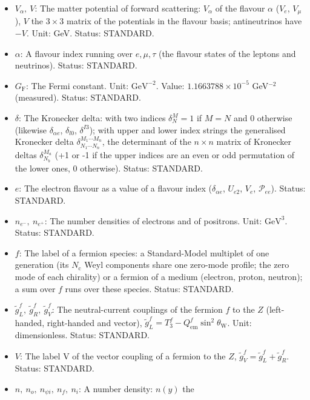 \documentclass[
  10pt,
]{article}
\providecommand{\tightlist}{%
  \setlength{\itemsep}{0pt}\setlength{\parskip}{0pt}}
\begin{document}
\begin{itemize}
\tightlist
\item
  \(V_\alpha,\ V\): The matter potential of forward scattering:
  \(V_\alpha\) of the flavour \(\alpha\) (\(V_e\), \(V_\mu\)), \(V\) the
  \(3 \times 3\) matrix of the potentials in the flavour basis;
  antineutrinos have \(-V\). Unit: GeV. Status: STANDARD.
\item
  \(\alpha\): A flavour index running over \(e, \mu, \tau\) (the flavour
  states of the leptons and neutrinos). Status: STANDARD.
\item
  \(G_{\mathrm{F}}\): The Fermi constant. Unit: \(\mathrm{GeV}^{-2}\).
  Value: \(1.1663788\times10^{-5}\) GeV\(^{-2}\) (measured). Status:
  STANDARD.
\item
  \(\delta\): The Kronecker delta: with two indices \(\delta^M_N = 1\)
  if \(M = N\) and 0 otherwise (likewise \(\delta_{\alpha e}\),
  \(\delta_{l0}\), \(\delta^{I3}\)); with upper and lower index strings
  the generalised Kronecker delta
  \(\delta^{M_1\cdots M_n}_{N_1\cdots N_n}\), the determinant of the
  \(n \times n\) matrix of Kronecker deltas \(\delta^{M_a}_{N_b}\) (+1
  or -1 if the upper indices are an even or odd permutation of the lower
  ones, 0 otherwise). Status: STANDARD.
\item
  \(e\): The electron flavour as a value of a flavour index
  (\(\delta_{\alpha e}\), \(U_{e2}\), \(V_e\), \(\mathcal{P}_{ee}\)).
  Status: STANDARD.
\item
  \(n_{e^-},\ n_{e^+}\): The number densities of electrons and of
  positrons. Unit: \(\mathrm{GeV}^{3}\). Status: STANDARD.
\item
  \(f\): The label of a fermion species: a Standard-Model multiplet of
  one generation (its \(N_{\mathrm{c}}\) Weyl components share one
  zero-mode profile; the zero mode of each chirality) or a fermion of a
  medium (electron, proton, neutron); a sum over \(f\) runs over these
  species. Status: STANDARD.
\item
  \(\tilde g^f_L,\ \tilde g^f_R,\ \tilde g^f_V\): The neutral-current
  couplings of the fermion \(f\) to the \(Z\) (left-handed, right-handed
  and vector),
  \(\tilde g^f_L = T_3^f - Q^f_{\mathrm{em}}\sin^2\theta_{\mathrm{W}}\).
  Unit: dimensionless. Status: STANDARD.
\item
  \(V\): The label V of the vector coupling of a fermion to the \(Z\),
  \(\tilde g^f_V = \tilde g^f_L + \tilde g^f_R\). Status: STANDARD.
\item
  \(n,\ n_o,\ n_{\psi i},\ n_f,\ n_i\): A number density: \(n(y)\) the

\end{itemize}
\end{document}
